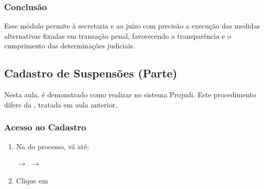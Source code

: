 \documentclass[letterpaper,10pt,brazil]{sphinxmanual}
\begin{document}
\subsubsection{Conclusão}
\label{\detokenize{projud_54_cadastromedidasalternativas:conclusao}}
\sphinxAtStartPar
Esse módulo permite à secretaria e ao juízo  com precisão a execução das medidas alternativas fixadas em transação penal, favorecendo a transparência e o cumprimento das determinações judiciais.

\sphinxstepscope


\subsection{Cadastro de Suspensões (Parte)}
\label{\detokenize{projud_55_cadastrosuspensao:cadastro-de-suspensoes-parte}}\label{\detokenize{projud_55_cadastrosuspensao::doc}}
\sphinxAtStartPar
Nesta aula, é demonstrado como realizar  no sistema Projudi. Este procedimento difere da , tratada em aula anterior.


\subsubsection{Acesso ao Cadastro}
\label{\detokenize{projud_55_cadastrosuspensao:acesso-ao-cadastro}}\begin{enumerate}
%
\item {} 
\sphinxAtStartPar
Na  do processo, vá até:

\sphinxAtStartPar
{} \(\rightarrow\)  \(\rightarrow\) 

\item {} 
\sphinxAtStartPar
Clique em 

\end{enumerate}
\end{document}

